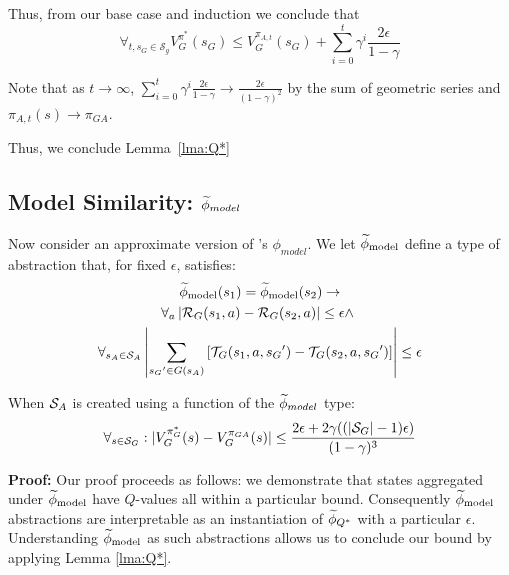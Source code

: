 Thus, from our base case and induction we conclude that
\begin{equation}
\forall_{t, s_G \in \mathcal{S}_g} V_G^{\pi^*}(s_G) \leq  V_G^{\pi_{A,t}}(s_G) + \sum_{i=0}^{t}\gamma^i \frac{2\epsilon}{1-\gamma}
\end{equation}

Note that as $t \rightarrow \infty$, $\sum_{i=0}^{t}\gamma^i \frac{2\epsilon}{1-\gamma} \rightarrow \frac{2\epsilon}{(1-\gamma)^2}$ by the sum of geometric series and $\pi_{A,t}(s) \rightarrow \pi_{GA}$.

Thus, we conclude Lemma~\ref{lma:Q*}

\subsection{Model Similarity: $\widetilde \phi_{model}$}
\label{sec:model}

Now consider an approximate version of \citeauthor{li2006towards}'s $\phi_{model}$. 
\bdefn{$\epM$}
We let $\epM$ define a type of abstraction that, for fixed $\epsilon$, satisfies:
\begin{multline}
\widetilde \phi_{\text{model}}(s_1) = \widetilde \phi_{\text{model}}(s_2) \rightarrow \\
\forall_a \left| \mathcal{R}_G(s_1, a) - \mathcal{R}_G(s_2, a)\right| \leq \epsilon \wedge\ \\
\forall_{s_A \in \mathcal{S}_A} \left|\sum_{{s_G}' \in G(s_A)} \left[\mathcal{T}_G(s_1, a, {s_G}') - \mathcal{T}_G(s_2, a,{s_G}')\right] \right| \leq \epsilon
\end{multline}
\edefn

\begin{lma}
\label{lma:model}
When $\mathcal{S}_A$ is created using a function of the $\widetilde \phi_{model}$ type:
\begin{equation}
\forall_{s \in \mathcal{S}_G} : | V_G^{\pi_G^*}(s) - V_G^{\pi_{GA}}(s) | \leq \frac{2\epsilon + 2\gamma((|\mathcal{S}_G|-1)\epsilon)}{(1-\gamma)^3}
\end{equation}
\end{lma}

{\bf Proof:} Our proof proceeds as follows: we demonstrate that states aggregated under $\epM$ have $Q$-values all within a particular bound. Consequently $\epM$ abstractions are interpretable as an instantiation of $\widetilde \phi_{Q^*}$ with a particular $\epsilon$. Understanding $\epM$ as such abstractions allows us to conclude our bound by applying Lemma \ref{lma:Q*}.

